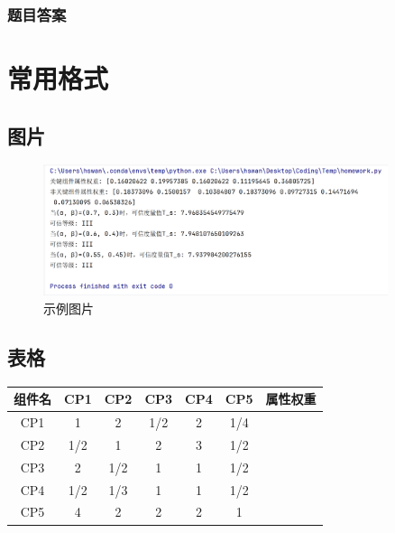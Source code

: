 \documentclass{article}
\begin{document}
\subsubsection{题目答案}












\section{常用格式}

\subsection{图片}

\begin{figure}[H]
	\centering
	\includegraphics[width=0.9\textwidth]{img/1.png}
	\caption{示例图片}
\end{figure}

\subsection{表格}

\begin{center}
	\begin{tabular}{|c|c|c|c|c|c|c|}
		\hline
		组件名 & CP1 & CP2 & CP3 & CP4 & CP5 & 属性权重 \\
		\hline
		CP1 & 1 & 2 & 1/2 & 2 & 1/4 & \\
		\hline
		CP2 & 1/2 & 1 & 2 & 3 & 1/2 & \\
		\hline
		CP3 & 2 & 1/2 & 1 & 1 & 1/2 & \\
		\hline
		CP4 & 1/2 & 1/3 & 1 & 1 & 1/2 & \\
		\hline
		CP5 & 4 & 2 & 2 & 2 & 1 & \\
		\hline
	\end{tabular}
\end{center}
\end{document}
